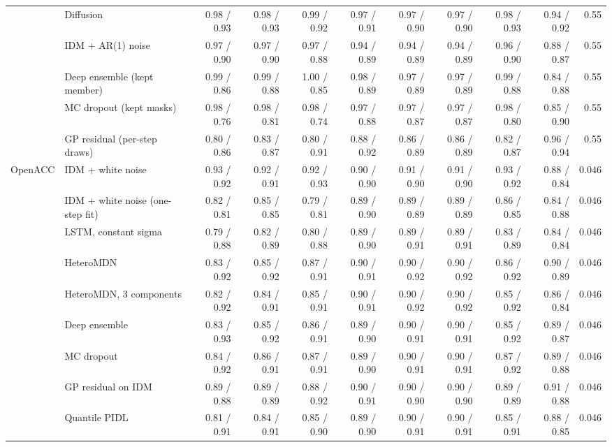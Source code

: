 \begin{longtable}{llrrrrrrrrr}
 & Diffusion & 0.98 / 0.93 & 0.98 / 0.93 & 0.99 / 0.92 & 0.97 / 0.91 & 0.97 / 0.90 & 0.97 / 0.90 & 0.98 / 0.93 & 0.94 / 0.92 & 0.55 \\
 & IDM + AR(1) noise & 0.97 / 0.90 & 0.97 / 0.90 & 0.97 / 0.88 & 0.94 / 0.89 & 0.94 / 0.89 & 0.94 / 0.89 & 0.96 / 0.90 & 0.88 / 0.87 & 0.55 \\
 & Deep ensemble (kept member) & 0.99 / 0.86 & 0.99 / 0.88 & 1.00 / 0.85 & 0.98 / 0.89 & 0.97 / 0.89 & 0.97 / 0.89 & 0.99 / 0.88 & 0.84 / 0.88 & 0.55 \\
 & MC dropout (kept masks) & 0.98 / 0.76 & 0.98 / 0.81 & 0.98 / 0.74 & 0.97 / 0.88 & 0.97 / 0.87 & 0.97 / 0.87 & 0.98 / 0.80 & 0.85 / 0.90 & 0.55 \\
 & GP residual (per-step draws) & 0.80 / 0.86 & 0.83 / 0.87 & 0.80 / 0.91 & 0.88 / 0.92 & 0.86 / 0.89 & 0.86 / 0.89 & 0.82 / 0.87 & 0.96 / 0.94 & 0.55 \\
\midrule
OpenACC & IDM + white noise & 0.93 / 0.92 & 0.92 / 0.91 & 0.92 / 0.93 & 0.90 / 0.90 & 0.91 / 0.90 & 0.91 / 0.90 & 0.93 / 0.92 & 0.88 / 0.84 & 0.046 \\
 & IDM + white noise (one-step fit) & 0.82 / 0.81 & 0.85 / 0.85 & 0.79 / 0.81 & 0.89 / 0.90 & 0.89 / 0.89 & 0.89 / 0.89 & 0.86 / 0.85 & 0.84 / 0.88 & 0.046 \\
 & LSTM, constant sigma & 0.79 / 0.88 & 0.82 / 0.89 & 0.80 / 0.88 & 0.89 / 0.90 & 0.89 / 0.91 & 0.89 / 0.91 & 0.83 / 0.89 & 0.84 / 0.84 & 0.046 \\
 & HeteroMDN & 0.83 / 0.92 & 0.85 / 0.92 & 0.87 / 0.91 & 0.90 / 0.91 & 0.90 / 0.92 & 0.90 / 0.92 & 0.86 / 0.92 & 0.90 / 0.89 & 0.046 \\
 & HeteroMDN, 3 components & 0.82 / 0.92 & 0.84 / 0.91 & 0.85 / 0.91 & 0.90 / 0.91 & 0.90 / 0.92 & 0.90 / 0.92 & 0.85 / 0.92 & 0.86 / 0.84 & 0.046 \\
 & Deep ensemble & 0.83 / 0.93 & 0.85 / 0.92 & 0.86 / 0.91 & 0.89 / 0.90 & 0.90 / 0.91 & 0.90 / 0.91 & 0.85 / 0.92 & 0.89 / 0.87 & 0.046 \\
 & MC dropout & 0.84 / 0.92 & 0.86 / 0.91 & 0.87 / 0.91 & 0.89 / 0.90 & 0.90 / 0.91 & 0.90 / 0.91 & 0.87 / 0.92 & 0.89 / 0.88 & 0.046 \\
 & GP residual on IDM & 0.89 / 0.88 & 0.89 / 0.89 & 0.88 / 0.92 & 0.90 / 0.91 & 0.90 / 0.90 & 0.90 / 0.90 & 0.89 / 0.89 & 0.91 / 0.88 & 0.046 \\
 & Quantile PIDL & 0.81 / 0.91 & 0.84 / 0.91 & 0.85 / 0.90 & 0.89 / 0.90 & 0.90 / 0.91 & 0.90 / 0.91 & 0.85 / 0.91 & 0.88 / 0.85 & 0.046 \\

\end{longtable}

